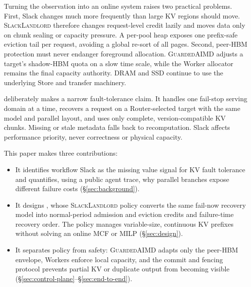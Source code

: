 Turning the observation into an online system raises two practical problems.
First, Slack changes much more frequently than large KV regions should move.
\textsc{SlackLandlord} therefore changes request-level credit lazily and moves
data only on chunk sealing or capacity pressure.  A per-pool heap exposes one
prefix-safe eviction tail per request, avoiding a global re-sort of all pages.
Second, peer-HBM protection must never endanger
foreground allocation.  \textsc{GuardedAIMD} adjusts a target's shadow-HBM
quota on a slow time scale, while the Worker allocator remains the final
capacity authority.  DRAM and SSD continue to use the underlying Store and
transfer machinery.

\system{} deliberately makes a narrow fault-tolerance claim.  It handles one
fail-stop serving domain at a time, recovers a request on a Router-selected
target with the same model and parallel layout, and uses only complete,
version-compatible KV chunks.  Missing or stale metadata falls back to
recomputation.  Slack affects performance priority, never correctness or
physical capacity.

This paper makes three contributions:

\begin{itemize}
  \item It identifies workflow Slack as the missing value signal for KV fault
  tolerance and quantifies, using a public agent trace, why parallel branches
  expose different failure costs (\S\ref{sec:background}).

  \item It designs \system{}, whose \textsc{SlackLandlord} policy converts the
  same fail-now recovery model into normal-period admission and eviction
  credits and failure-time recovery order.  The policy manages variable-size,
  continuous KV prefixes without solving an online MCF or MILP
  (\S\ref{sec:design}).

  \item It separates policy from safety: \textsc{GuardedAIMD} adapts only the
  peer-HBM envelope, Workers enforce local capacity, and the commit and fencing
  protocol prevents partial KV or duplicate output from becoming visible
  (\S\ref{sec:control-plane}--\S\ref{sec:end-to-end}).
\end{itemize}

